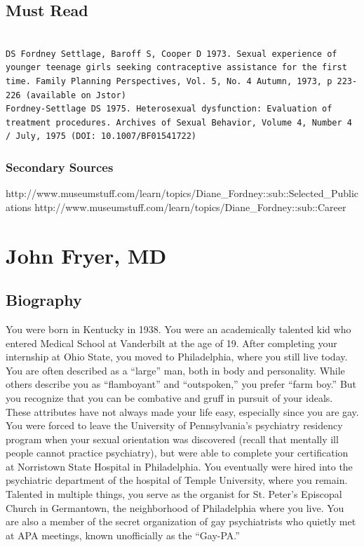 \section{Must Read}
\label{mustread}

\begin{adjustwidth}{2.5em}{2.5em}
\begin{verbatim}

DS Fordney Settlage, Baroff S, Cooper D 1973. Sexual experience of younger teenage girls seeking contraceptive assistance for the first time. Family Planning Perspectives, Vol. 5, No. 4 Autumn, 1973, p 223-226 (available on Jstor)
Fordney-Settlage DS 1975. Heterosexual dysfunction: Evaluation of treatment procedures. Archives of Sexual Behavior, Volume 4, Number 4 / July, 1975 (DOI: 10.1007/BF01541722)

\end{verbatim}
\end{adjustwidth}

\subsection{Secondary Sources}
\label{secondarysources}

http:\slash \slash www.museumstuff.com\slash learn\slash topics\slash Diane\_Fordney::sub::Selected\_Publications
http:\slash \slash www.museumstuff.com\slash learn\slash topics\slash Diane\_Fordney::sub::Career

\chapter{John Fryer, MD}
\label{johnfryermd}

\section{Biography}
\label{biography}

You were born in Kentucky in 1938. You were an academically talented kid who entered Medical School at Vanderbilt at the age of 19. After completing your internship at Ohio State, you moved to Philadelphia, where you still live today.
You are often described as a “large” man, both in body and personality. While others describe you as “flamboyant” and “outspoken,” you prefer “farm boy.” But you recognize that you can be combative and gruff in pursuit of your ideals. These attributes have not always made your life easy, especially since you are gay. You were forced to leave the University of Pennsylvania's psychiatry residency program when your sexual orientation was discovered (recall that mentally ill people cannot practice psychiatry), but were able to complete your certification at Norristown State Hospital in Philadelphia.
You eventually were hired into the psychiatric department of the hospital of Temple University, where you remain. Talented in multiple things, you serve as the organist for St. Peter's Episcopal Church in Germantown, the neighborhood of Philadelphia where you live.
You are also a member of the secret organization of gay psychiatrists who quietly met at APA meetings, known unofficially as the “Gay-PA.”

